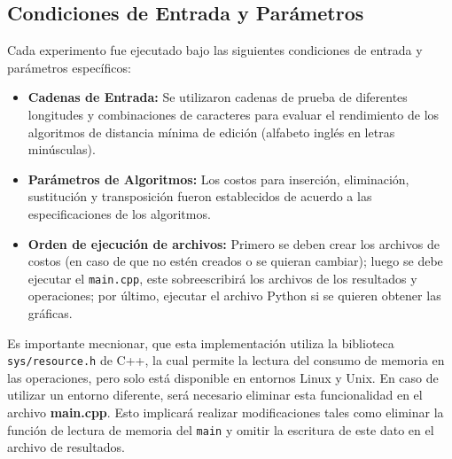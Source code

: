 \subsection*{Condiciones de Entrada y Parámetros}

Cada experimento fue ejecutado bajo las siguientes condiciones de entrada y parámetros específicos:
\begin{itemize}
    \item \textbf{Cadenas de Entrada:} Se utilizaron cadenas de prueba de diferentes longitudes y combinaciones de caracteres para evaluar el rendimiento de los algoritmos de distancia mínima de edición (alfabeto inglés en letras minúsculas). 
    \item \textbf{Parámetros de Algoritmos:} Los costos para inserción, eliminación, sustitución y transposición fueron establecidos de acuerdo a las especificaciones de los algoritmos.
    \item \textbf{Orden de ejecución de archivos:} Primero se deben crear los archivos de costos (en caso de que no estén creados o se quieran cambiar); luego se debe ejecutar el \verb|main.cpp|, este sobreescribirá los archivos de los resultados y operaciones; por último, ejecutar el archivo Python si se quieren obtener las gráficas.
\end{itemize}

Es importante mecnionar, que esta implementación utiliza la biblioteca \texttt{sys/resource.h} de C++, la cual permite la lectura del consumo de memoria en las operaciones, pero solo está disponible en entornos Linux y Unix. En caso de utilizar un entorno diferente, será necesario eliminar esta funcionalidad en el archivo \textbf{main.cpp}. Esto implicará realizar modificaciones tales como eliminar la función de lectura de memoria del \texttt{main} y omitir la escritura de este dato en el archivo de resultados.
